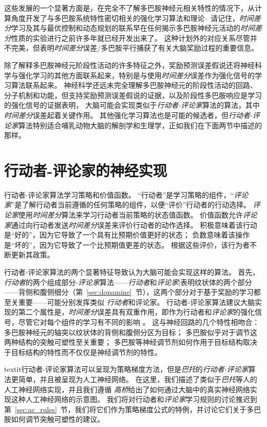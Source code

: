这些发展的一个显著方面是，在完全不了解多巴胺神经元相关特性的情况下，从计算角度开发了与多巴胺系统特性密切相关的强化学习算法和理论-- 请记住，\textit{时间差分}学习及其与最优控制和动态规划的联系早在任何揭示多巴胺神经元活动的\textit{时间差分}性质的实验进行之前许多年就已经开发出来了。
这种计划外的对应关系尽管并不完美，但表明\textit{时间差分}误差/多巴胺平行捕获了有关大脑奖励过程的重要信息。


除了解释多巴胺神经元阶段性活动的许多特征之外，奖励预测误差假说还将神经科学与强化学习的其他方面联系起来，特别是与使用\textit{时间差分}误差作为强化信号的学习算法联系起来。
神经科学还远未完全理解多巴胺神经元的阶段性活动的回路、分子机制和功能，但支持奖励预测误差假说的证据，以及阶段性多巴胺响应是学习的强化信号的证据表明， 大脑可能会实现类似于\textit{行动者-评论家}算法的算法，其中\textit{时间差分}误差起着关键作用。
其他强化学习算法也是可能的候选者，但\textit{行动者-评论家}算法特别适合哺乳动物大脑的解剖学和生理学，正如我们在下面两节中描述的那样。



\section{行动者-评论家的神经实现} \label{sec:neural_ac}

行动者-评论家算法学习策略和价值函数。
“行动者”是学习策略的组件，“\textit{评论家}”是了解行动者当前遵循的任何策略的组件，以便“评价”行动者的行动选择。
\textit{评论家}使用\textit{时间差分}算法来学习行动者当前策略的状态值函数。
价值函数允许\textit{评论家}通过向行动者发送\textit{时间差分}误差来评价行动者的动作选择。
积极意味着该行动是“好的”，因为它导致了一个具有比预期价值更好的状态；
负数意味着该操作是“坏的”，因为它导致了一个比预期值更差的状态。
根据这些评价，该行为者不断更新其政策。


行动者-评论家算法的两个显著特征导致认为大脑可能会实现这样的算法。
首先，\textit{行动者}的两个组成部分-\textit{评论家}算法——\textit{行动者}和\textit{评论家}|表明纹状体的两个部分——背侧和腹侧细分（第~\ref{sec:dopamine}~节），这两个部分对于基于奖励的学习都至关重要——可能分别发挥类似 \textit{行动者}和评论家。
行动者-评论家算法建议大脑实现的第二个属性是，\textit{时间差分}误差具有双重作用，即作为行动者和\textit{评论家}的强化信号，尽管它对每个组件的学习有不同的影响 。
这与神经回路的几个特性相吻合：多巴胺神经元的轴突以纹状体的背侧和腹侧分区为目标；
多巴胺似乎对于调节这两种结构的突触可塑性至关重要；
多巴胺等神经调节剂如何作用于目标结构取决于目标结构的特性而不仅仅是神经调节剂的特性。


textit{行动者-评论家}算法可以呈现为策略梯度方法，但是\textit{巴托}\cite{barto13neuron}的\textit{行动者-评论家}算法更简单，并且被呈现为人工神经网络。
在这里，我们描述了类似于\textit{巴托}等人的人工神经网络实现，并且我们遵循 \textit{高桥}\cite{takahashi2008silencing}给出了如何通过大脑中的真实神经网络实现这种人工神经网络的示意图。
我们将对行动者和\textit{评论家}学习规则的讨论推迟到第~\ref{sec:ac_rules}~节，我们将它们作为策略梯度公式的特例，并讨论它们关于多巴胺如何调节突触可塑性的建议。


